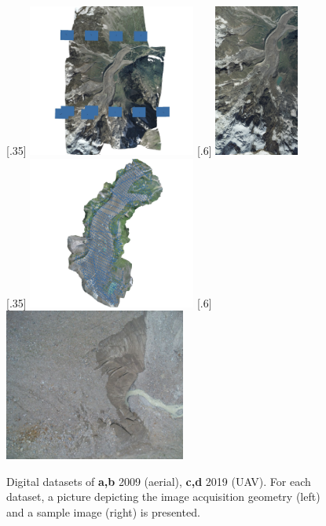 \begin{figure}[ht]
    \centering
    \subcaptionbox{\label{fig:2:datasets_digital:2009_block}}[.35\textwidth]{
        \includegraphics[height=5cm]{2009_block}
    } \quad
    \subcaptionbox{\label{fig:2:datasets_digital:2009_img}}[.6\textwidth]{
        \includegraphics[height=5cm]{2009_img}
    } \\
    \subcaptionbox{\label{fig:2:datasets_digital:2019_block}}[.35\textwidth]{
        \includegraphics[height=5cm]{2019_block}
    } \quad
    \subcaptionbox{\label{fig:2:datasets_digital:2019_img}}[.6\textwidth]{
        \includegraphics[height=5cm]{2019_img}
    } \\
    \caption{Digital datasets of \textbf{a,b} 2009 (aerial), \textbf{c,d} 2019 (UAV). For each dataset, a picture depicting the image acquisition geometry (left) and a sample image (right) is presented.}
    \label{fig:2:datasets_digital}
\end{figure}

